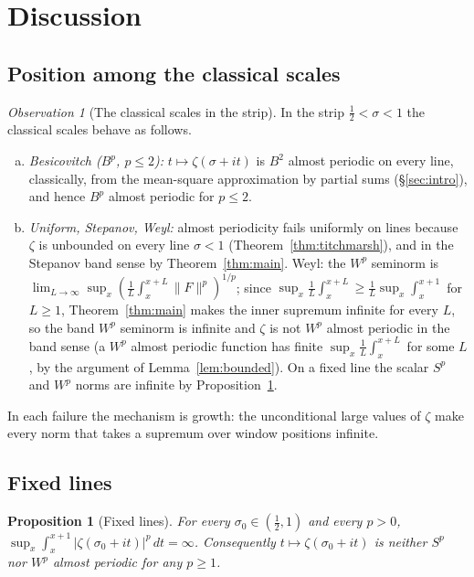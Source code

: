 \documentclass[11pt]{amsart}
\newtheorem{proposition}[theorem]{Proposition}
\theoremstyle{definition}
\theoremstyle{remark}
\newtheorem{observation}[theorem]{Observation}
\begin{document}
\section{Discussion}\label{sec:discussion}

\subsection{Position among the classical scales}

\begin{observation}[The classical scales in the strip]
\label{obs:dichotomy}
In the strip $\tfrac12<\sigma<1$ the classical scales behave as
follows.
\begin{enumerate}[(a)]
\item \emph{Besicovitch ($B^p$, $p\le2$):} $t\mapsto\zeta(\sigma+it)$
is $B^2$ almost periodic on every line, classically, from the
mean-square approximation by partial sums (\S\ref{sec:intro}), and
hence $B^p$ almost periodic for $p\le2$.
\item \emph{Uniform, Stepanov, Weyl:} almost periodicity fails
uniformly on lines because $\zeta$ is unbounded on every line
$\sigma<1$ (Theorem~\ref{thm:titchmarsh}), and in the Stepanov band
sense by Theorem~\ref{thm:main}. Weyl: the $W^p$ seminorm is
$\lim_{L\to\infty}\sup_x(\frac1L\int_x^{x+L}\|F\|^p)^{1/p}$; since
$\sup_x\frac1L\int_x^{x+L}\ge\frac1L\sup_x\int_x^{x+1}$ for $L\ge1$,
Theorem~\ref{thm:main} makes the inner supremum infinite for every
$L$, so the band $W^p$ seminorm is infinite and $\zeta$ is not $W^p$ almost periodic in the band sense (a
$W^p$ almost periodic function has finite $\sup_x\frac1L\int_x^{x+L}$
for some $L$, by the argument of Lemma~\ref{lem:bounded}). On a fixed
line the scalar $S^p$ and $W^p$ norms are infinite by
Proposition~\ref{prop:fixedline}.
\end{enumerate}
In each failure the mechanism is growth: the unconditional large values
of $\zeta$ make every norm that takes a supremum over window positions
infinite.
\end{observation}

\subsection{Fixed lines}

\begin{proposition}[Fixed lines]\label{prop:fixedline}
For every $\sigma_0\in(\tfrac12,1)$ and every $p>0$,
$\sup_x\int_x^{x+1}|\zeta(\sigma_0+it)|^p\,dt=\infty$. Consequently
$t\mapsto\zeta(\sigma_0+it)$ is neither $S^p$ nor $W^p$ almost periodic
for any $p\ge1$.
\end{proposition}
\end{document}
